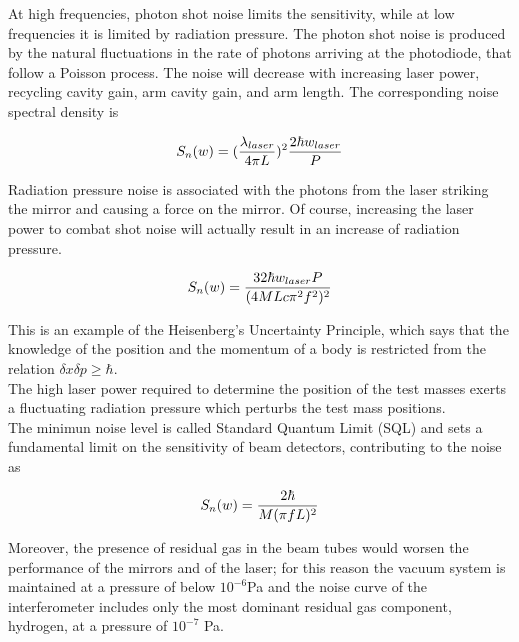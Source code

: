 \documentclass[binding=0.6cm, LaM]{sapthesis}
\begin{document}
        At high frequencies, photon shot noise limits the sensitivity, 
	while at low frequencies it is limited by radiation pressure.
        The photon shot noise is produced by the natural fluctuations in the rate of photons arriving at the photodiode,
        that follow a Poisson process. The noise will decrease with increasing laser power,
        recycling cavity gain, arm cavity gain, and arm length.
        The corresponding noise spectral density is

                \begin{equation}
                S_n(w) = ({{\lambda_{laser}} \over {4 \pi L}})^2 {{2 \hbar w_{laser}} \over {P}}
                \end{equation}

        Radiation pressure noise is associated with the photons from the laser striking the mirror
        and causing a force on the mirror. Of course, increasing the laser power to combat shot noise
        will actually result in an increase of radiation pressure.

                \begin{equation}
                S_n(w) =  {{32 \hbar w_{laser}P} \over {(4MLc \pi^2 f^2)^2}}
                \end{equation}

        This is an example of the Heisenberg’s Uncertainty Principle, which says that the knowledge
        of the position and the momentum of a body is restricted from the relation $\delta x \delta p \geq \hbar$. \\
        The high laser power required to determine the position of the test masses exerts
        a fluctuating radiation pressure which perturbs the test mass positions. \\
        The minimun noise level is called Standard Quantum Limit (SQL) and sets a fundamental limit
        on the sensitivity of beam detectors, contributing to the noise as

                \begin{equation}
                S_n(w) = {{2 \hbar} \over {M(\pi f L)^2}}
                \end{equation}

        Moreover, the presence of residual gas in the beam tubes would worsen the performance
        of the mirrors and of the laser; for this reason the vacuum system is maintained at a pressure
        of below $10^{-6}$Pa and the noise curve of the interferometer includes only
        the most dominant residual gas component, hydrogen, at a pressure of $10^{−7}$ Pa. \\
\end{document}
